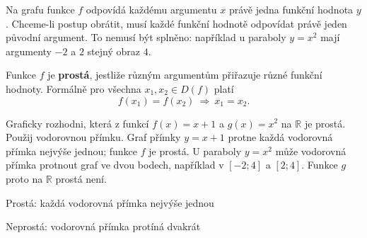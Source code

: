 \documentclass[11pt,a4paper]{article}
\begin{document}

Na grafu funkce $f$ odpovídá každému argumentu $x$ právě jedna funkční hodnota $y$. Chceme-li postup obrátit, musí každé funkční hodnotě odpovídat právě jeden původní argument. To nemusí být splněno: například u paraboly $y=x^2$ mají argumenty $-2$ a $2$ stejný obraz $4$.

\begin{definiceBox}[title={Definice - Prostá funkce}]
Funkce $f$ je \textbf{prostá}, jestliže různým argumentům přiřazuje různé funkční hodnoty. Formálně pro všechna $x_1,x_2\in D(f)$ platí
\[
f(x_1)=f(x_2)\ \Longrightarrow\ x_1=x_2.
\]
\end{definiceBox}

\begin{prikladReseniBox}[title={Příklad 1}]
Graficky rozhodni, která z funkcí $f(x)=x+1$ a $g(x)=x^2$ na $\mathbb R$ je prostá. Použij vodorovnou přímku.
\tcblower
Graf přímky $y=x+1$ protne každá vodorovná přímka nejvýše jednou; funkce $f$ je prostá. U paraboly $y=x^2$ může vodorovná přímka protnout graf ve dvou bodech, například v $[-2;4]$ a $[2;4]$. Funkce $g$ proto na $\mathbb R$ prostá není.
\end{prikladReseniBox}

\begin{center}
\begin{minipage}{.45\linewidth}\centering
{}
\par\footnotesize Prostá: každá vodorovná přímka nejvýše jednou
\end{minipage}\hfill
\begin{minipage}{.45\linewidth}\centering
{}
\par\footnotesize Neprostá: vodorovná přímka protíná dvakrát
\end{minipage}
\end{center}
\end{document}
